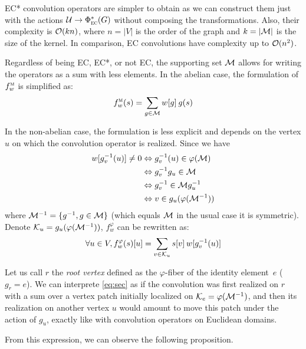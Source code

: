 \begin{remark}EC* convolution operators are simpler to obtain as we can construct them just with the actions $\cu \to \Phi^*_{\EC}(G)$ without composing the transformations. Also, their complexity is $\co(kn)$, where $n = |V|$ is the order of the graph and $k = |\cm|$ is the size of the kernel. In comparison, EC convolutions have complexity up to $\co(n^2)$.
\end{remark}

Regardless of being EC, EC*, or not EC, the supporting set $\cm$ allows for writing the operators as a sum with less elements. In the abelian case, the formulation of $f_w^{\M}$ is simplified as:
\begin{gather}
f_w^{\M}(s) = \displaystyle\sum_{g \in \cm} w[g] \h{2} g(s) \label{eq:secm}
\end{gather}

In the non-abelian case, the formulation is less explicit and depends on the vertex $u$ on which the convolution operator is realized. Since we have
\begin{align*}
w[g_v^{-1}(u)] \neq 0 & \Leftrightarrow g_v^{-1}(u) \in \varphi(\cm)\\
                    & \Leftrightarrow g_v^{-1}g_u \in \cm\\
                    & \Leftrightarrow g_v^{-1} \in \cm g_u^{-1}\\
                    & \Leftrightarrow v \in g_u(\varphi(\cm^{-1}))
\end{align*}
where $\cm^{-1} = \{ g^{-1}, g \in \cm\}$ (which equals $\cm$ in the usual case it is symmetric). Denote $\ck_u = g_u(\varphi(\cm^{-1}))$, $f_w^{\varphi}$ can be rewritten as:
\begin{gather}
\forall u \in V, f_w^{\varphi}(s)[u] = \displaystyle\sum_{ v \in \ck_u} s[v] \h{2} w[g_v^{-1}(u)] \label{eq:sec}
\end{gather}

Let us call $r$ the \emph{root vertex} defined as the $\varphi$-fiber of the identity element~$e$ (\ie $g_r = e$). We can interprete \eqref{eq:sec} as if the convolution was first realized on $r$ with a sum over a vertex patch initially localized on $\ck_e = \varphi(\cm^{-1})$, and then its realization on another vertex $u$ would amount to move this patch under the action of $g_u$, exactly like with convolution operators on Euclidean domains.

From this expression, we can observe the following proposition.

